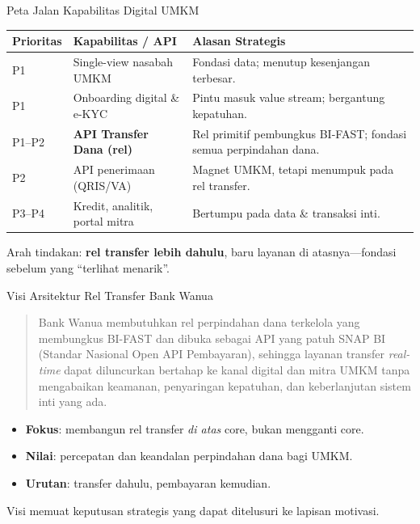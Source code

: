 \documentclass[aspectratio=169, table]{beamer}
\newcommand{\takeaway}[1]{%
  \vspace{4pt}
  {\footnotesize #1}
}
\begin{document}
\begin{frame}{Peta Jalan Kapabilitas Digital UMKM}
  \vspace{2pt}
  \scriptsize
  \setlength{\extrarowheight}{2pt}
  \setlength{\arrayrulewidth}{0.5pt}
  \begin{tabularx}{\textwidth}{|p{}|p{}|X|}
    \hline
    \rowcolor{praditagreen!18}
    \textbf{Prioritas} & \textbf{Kapabilitas / API} & \textbf{Alasan Strategis} \\
    \hline
    P1 & Single-view nasabah UMKM & Fondasi data; menutup kesenjangan terbesar. \\
    \hline
    P1 & Onboarding digital \& e-KYC & Pintu masuk value stream; bergantung kepatuhan. \\
    \hline
    \rowcolor{orange!18}
    P1--P2 & \textbf{API Transfer Dana (rel)} & Rel primitif pembungkus BI-FAST; fondasi semua perpindahan dana. \\
    \hline
    P2 & API penerimaan (QRIS/VA) & Magnet UMKM, tetapi menumpuk pada rel transfer. \\
    \hline
    P3--P4 & Kredit, analitik, portal mitra & Bertumpu pada data \& transaksi inti. \\
    \hline
  \end{tabularx}
  \vspace{4pt}
  \takeaway{Arah tindakan: \textbf{rel transfer lebih dahulu}, baru layanan di
  atasnya---fondasi sebelum yang ``terlihat menarik''.}
\end{frame}

\begin{frame}{Visi Arsitektur Rel Transfer Bank Wanua}
  \vspace{6pt}
  \footnotesize
  \begin{quote}
  Bank Wanua membutuhkan rel perpindahan dana terkelola yang membungkus BI-FAST
  dan dibuka sebagai API yang patuh SNAP BI (Standar Nasional Open API
  Pembayaran), sehingga layanan transfer \emph{real-time} dapat diluncurkan
  bertahap ke kanal digital dan mitra UMKM tanpa mengabaikan keamanan,
  penyaringan kepatuhan, dan keberlanjutan sistem inti yang ada.
  \end{quote}
  \vspace{2pt}
  \begin{itemize}\setlength{\itemsep}{2pt}
    \item \textbf{Fokus}: membangun rel transfer \emph{di atas} core, bukan
          mengganti core.
    \item \textbf{Nilai}: percepatan dan keandalan perpindahan dana bagi UMKM.
    \item \textbf{Urutan}: transfer dahulu, pembayaran kemudian.
  \end{itemize}
  \takeaway{Visi memuat keputusan strategis yang dapat ditelusuri ke lapisan
  motivasi.}
\end{frame}
\end{document}
